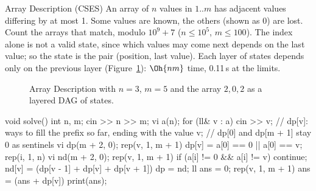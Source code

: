 \begin{problem}{Array Description (CSES)}
An array of $n$ values in $1..m$ has adjacent values differing by at most 1. Some values are known, the others (shown as 0) are
lost. Count the arrays that match, modulo $10^9 + 7$ ($n \le 10^5$, $m \le 100$).
\solution The index alone is not a valid state, since which values may come next depends on the last value; so the state is the
pair (position, last value). Each layer of states depends only on the previous layer (Figure~\ref{fig:arraydesc}): $\Oh{nm}$ time,
0.11\,s at the limits.
\end{problem}

\begin{figure}[htbp]
\centering
{}
\caption{Array Description with $n = 3$, $m = 5$ and the array $2, 0, 2$ as a layered DAG of states.}
\label{fig:arraydesc}
\end{figure}

\begin{code}
void solve() {
    int n, m;
    cin >> n >> m;
    vi a(n);
    for (ll& v : a) cin >> v;
    // dp[v]: ways to fill the prefix so far, ending with the value v;
    // dp[0] and dp[m + 1] stay 0 as sentinels
    vi dp(m + 2, 0);
    rep(v, 1, m + 1) dp[v] = a[0] == 0 || a[0] == v;
    rep(i, 1, n) {
        vi nd(m + 2, 0);
        rep(v, 1, m + 1) {
            if (a[i] != 0 && a[i] != v) continue;
            nd[v] = (dp[v - 1] + dp[v] + dp[v + 1]) %
        }
        dp = nd;
    }
    ll ans = 0;
    rep(v, 1, m + 1) ans = (ans + dp[v]) %
    print(ans);
}
\end{code}

